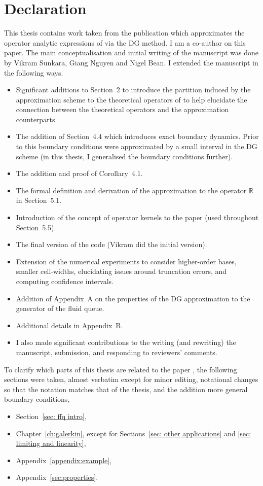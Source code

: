 \chapter{Declaration}
\label{ch:declaration}

This thesis contains work taken from the publication \cite{blnos2022} which approximates the operator analytic expressions of \cite{bo2014} via the DG method. I am a co-author on this paper. The main conceptualisation and initial writing of the manuscript was done by Vikram Sunkara, Giang Nguyen and Nigel Bean. I extended the manuscript in the following ways.
\begin{itemize}
    \item Significant additions to Section~2 to introduce the partition induced by the approximation scheme to the theoretical operators of \cite{bo2014} to help elucidate the connection between the theoretical operators and the approximation counterparts. 
    \item The addition of Section~4.4 which introduces exact boundary dynamics. Prior to this boundary conditions were approximated by a small interval in the DG scheme (in this thesis, I generalised the boundary conditions further).
    \item The addition and proof of Corollary~4.1.
    \item The formal definition and derivation of the approximation to the operator \(\mathbb R\) in Section~5.1. 
    \item Introduction of the concept of operator kernels to the paper (used throughout Section~5.5).
    \item The final version of the code (Vikram did the initial version).
    \item Extension of the numerical experiments to consider higher-order bases, smaller cell-widths, elucidating issues around truncation errors, and computing confidence intervals. 
    \item Addition of Appendix~A on the properties of the DG approximation to the generator of the fluid queue.
    \item Additional details in Appendix~B. 
    \item I also made significant contributions to the writing (and rewriting) the manuscript, submission, and responding to reviewers' comments. 
\end{itemize}
To clarify which parts of this thesis are related to the paper \cite{blnos2022}, the following sections were taken, almost verbatim except for minor editing, notational changes so that the notation matches that of the thesis, and the addition more general boundary conditions,
\begin{itemize}
    \item Section~\ref{sec: ffq intro},
    \item Chapter~\ref{ch:galerkin}, except for Sections~\ref{sec: other applications} and \ref{sec: limiting and linearity},
    \item Appendix~\ref{appendix:example},
    \item Appendix~\ref{sec:properties}.
\end{itemize}